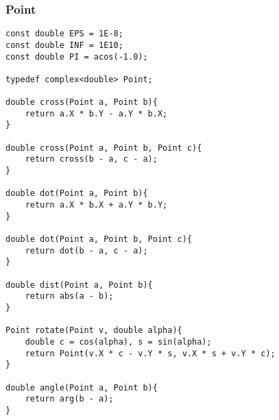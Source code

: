 \subsubsection{Point}
\begin{verbatim}
const double EPS = 1E-8;
const double INF = 1E10;
const double PI = acos(-1.0);

typedef complex<double> Point;

double cross(Point a, Point b){
    return a.X * b.Y - a.Y * b.X;
}

double cross(Point a, Point b, Point c){
    return cross(b - a, c - a);
}

double dot(Point a, Point b){
    return a.X * b.X + a.Y * b.Y;
}

double dot(Point a, Point b, Point c){
    return dot(b - a, c - a);
}

double dist(Point a, Point b){
    return abs(a - b);
}

Point rotate(Point v, double alpha){
    double c = cos(alpha), s = sin(alpha);
    return Point(v.X * c - v.Y * s, v.X * s + v.Y * c);
}

double angle(Point a, Point b){
    return arg(b - a);
}
\end{verbatim}

